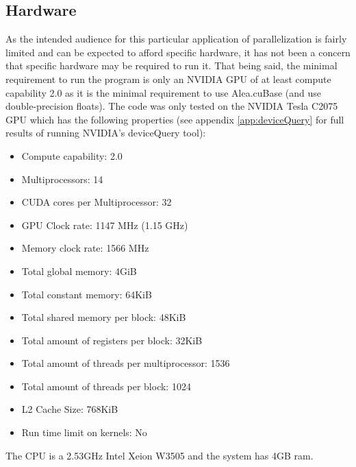 \subsection{Hardware}\label{subsec:background:hardware}
As the intended audience for this particular application of parallelization is fairly limited and can be expected to afford specific hardware, it has not been a concern that specific hardware may be required to run it.
That being said, the minimal requirement to run the program is only an NVIDIA GPU of at least compute capability 2.0 as it is the minimal requirement to use Alea.cuBase (and use double-precision floats).
The code was only tested on the NVIDIA Tesla C2075 GPU which has the following properties (see appendix \ref{app:deviceQuery} for full results of running NVIDIA's deviceQuery tool):

\begin{itemize}
\item Compute capability: 2.0
\item Multiprocessors: 14
\item CUDA cores per Multiprocessor: 32
\item GPU Clock rate: 1147 MHz (1.15 GHz)
\item Memory clock rate: 1566 MHz
\item Total global memory: 4GiB
\item Total constant memory: 64KiB
\item Total shared memory per block: 48KiB
\item Total amount of registers per block: 32KiB
\item Total amount of threads per multiprocessor: 1536
\item Total amount of threads per block: 1024
\item L2 Cache Size: 768KiB
\item Run time limit on kernels: No
\end{itemize}

The CPU is a 2.53GHz Intel Xeion W3505 and the system has 4GB ram.